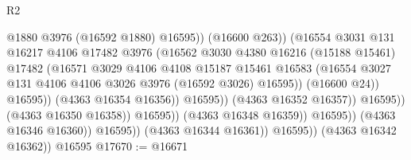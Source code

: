 \begin{lexlean}{R2}
\begin{coremodule}
                                                  @1880
                                                  @3976
                                                  (@16592 @1880)
                                                  @16595))
                                              (@16600 @263))
                                            (@16554
                                              @3031
                                              @131
                                              @16217
                                              @4106
                                              @17482
                                              @3976
                                              (@16562
                                                @3030
                                                @4380
                                                @16216
                                                (@15188 @15461)
                                                @17482
                                                (@16571
                                                  @3029
                                                  @4106
                                                  @4108
                                                  @15187
                                                  @15461
                                                  @16583
                                                  (@16554
                                                    @3027
                                                    @131
                                                    @4106
                                                    @4106
                                                    @3026
                                                    @3976
                                                    (@16592 @3026)
                                                    @16595))
                                                (@16600 @24))
                                              @16595))
                                          (@4363 @16354 @16356))
                                        @16595))
                                    (@4363 @16352 @16357))
                                  @16595))
                              (@4363 @16350 @16358))
                            @16595))
                        (@4363 @16348 @16359))
                      @16595))
                  (@4363 @16346 @16360))
                @16595))
            (@4363 @16344 @16361))
          @16595))
      (@4363 @16342 @16362))
    @16595
@17670 := @16671

\end{coremodule}
\end{lexlean}
